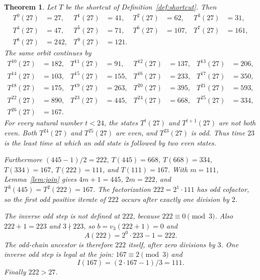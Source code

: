 \documentclass[11pt,letterpaper]{article}
\newtheorem{theorem}{Theorem}
\begin{document}
\begin{theorem}
\label{thm:parent-rise}
Let \(T\) be the shortcut of Definition~\ref{def:shortcut}. Then
\begin{align*}
T^{0}(27)&=27,&
T^{1}(27)&=41,&
T^{2}(27)&=62,&
T^{3}(27)&=31,\\
T^{4}(27)&=47,&
T^{5}(27)&=71,&
T^{6}(27)&=107,&
T^{7}(27)&=161,\\
T^{8}(27)&=242,&
T^{9}(27)&=121.
\end{align*}
The same orbit continues by
\begin{align*}
T^{10}(27)&=182,&
T^{11}(27)&=91,&
T^{12}(27)&=137,&
T^{13}(27)&=206,\\
T^{14}(27)&=103,&
T^{15}(27)&=155,&
T^{16}(27)&=233,&
T^{17}(27)&=350,\\
T^{18}(27)&=175,&
T^{19}(27)&=263,&
T^{20}(27)&=395,&
T^{21}(27)&=593,\\
T^{22}(27)&=890,&
T^{23}(27)&=445,&
T^{24}(27)&=668,&
T^{25}(27)&=334,\\
T^{26}(27)&=167.
\end{align*}
For every natural number \(t<24\), the states \(T^{t}(27)\) and \(T^{t+1}(27)\) are not both even. Both \(T^{24}(27)\) and \(T^{25}(27)\) are even, and \(T^{23}(27)\) is odd. Thus time \(23\) is the least time at which an odd state is followed by two even states.

Furthermore \((445-1)/2=222\), \(T(445)=668\), \(T(668)=334\), \(T(334)=167\), \(T(222)=111\), and \(T(111)=167\). With \(m=111\), Lemma~\ref{lem:join} gives \(4m+1=445\), \(2m=222\), and \(T^{3}(445)=T^{2}(222)=167\). The factorization \(222=2^{1}\cdot 111\) has odd cofactor, so the first odd positive iterate of \(222\) occurs after exactly one division by \(2\).

The inverse odd step is not defined at \(222\), because \(222\equiv 0\pmod{3}\). Also \(222+1=223\) and \(3\nmid 223\), so \(b=v_{3}(222+1)=0\) and
\[
A(222)=2^{0}\cdot 223-1=222.
\]
The odd-chain ancestor is therefore \(222\) itself, after zero divisions by \(3\). One inverse odd step is legal at the join: \(167\equiv 2\pmod{3}\) and
\[
I(167)=(2\cdot 167-1)/3=111.
\]
Finally \(222>27\).
\end{theorem}
\end{document}

